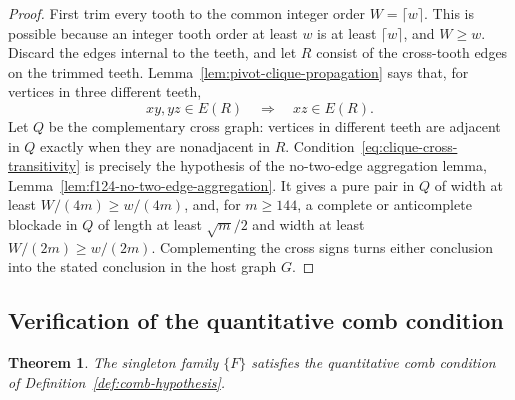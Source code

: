 \documentclass[11pt]{article}
\numberwithin{equation}{section}
\theoremstyle{plain}
\newtheorem{theorem}{Theorem}[section]
\theoremstyle{definition}
\begin{document}
\begin{proof}
First trim every tooth to the common integer order
$W=\lceil w\rceil$.  This is possible because an integer tooth order
at least $w$ is at least $\lceil w\rceil$, and $W\geq w$.  Discard the
edges internal to the teeth, and let
$R$ consist of the cross-tooth edges on the trimmed teeth.
Lemma~\ref{lem:pivot-clique-propagation} says that, for vertices
in three different teeth,
\begin{equation}
                  xy,yz\in E(R)\quad\Longrightarrow\quad xz\in E(R).
 \label{eq:clique-cross-transitivity}
\end{equation}
Let $Q$ be the complementary cross graph: vertices in different teeth
are adjacent in $Q$ exactly when they are nonadjacent in $R$.
Condition~\eqref{eq:clique-cross-transitivity} is precisely the
hypothesis of the no-two-edge aggregation lemma,
Lemma~\ref{lem:f124-no-two-edge-aggregation}.  It gives a pure
pair in $Q$ of width at least $W/(4m)\geq w/(4m)$, and, for $m\geq144$,
a complete or anticomplete blockade in $Q$ of length at least
$\sqrt m/2$ and width at least $W/(2m)\geq w/(2m)$.  Complementing the
cross signs turns either conclusion into the stated conclusion in the
host graph $G$.
\end{proof}

\subsection{Verification of the quantitative comb condition}

\begin{theorem}
\label{thm:F-comb-conclusion}
The singleton family $\{F\}$ satisfies the quantitative comb condition of
Definition~\ref{def:comb-hypothesis}.
\end{theorem}
\end{document}
